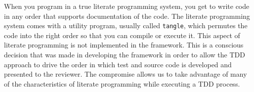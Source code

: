 When you program in a true literate programming system, you 
get to write code in any order that supports documentation of the code. The literate programming system 
comes with a utility program, 
usually called \lstinline{tangle}, which permutes the code into the right order so that you can compile or execute it.
This aspect of literate programming is not implemented in the \seamless framework. This is a conscious decision 
that was made in developing the framework in order to allow the 
TDD approach to drive the order in which test and source code is developed and presented to the
reviewer.  The compromise allows us to take advantage of many of the characteristics of literate programming while
executing a TDD process.

